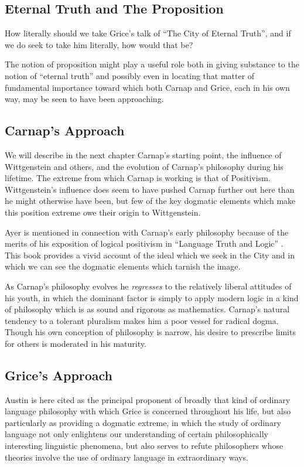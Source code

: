 \documentclass[10pt,titlepage]{book}
\begin{document}
\subsection{Eternal Truth and The Proposition}

How literally should we take Grice's talk of ``The City of Eternal Truth'', and if we do seek to take him literally, how would that be?

The notion of proposition might play a useful role both in giving substance to the notion of ``eternal truth'' and possibly even in locating that matter of fundamental importance toward which both Carnap and Grice, each in his own way, may be seen to have been approaching.

\subsection{Carnap's Approach}

We will describe in the next chapter Carnap's starting point, the influence of Wittgenstein and others, and the evolution of Carnap's philosophy during his lifetime.
The extreme from which Carnap is working is that of Positivism.
Wittgenstein's influence does seem to have pushed Carnap further out here than he might otherwise have been, but few of the key dogmatic elements which make this position extreme owe their origin to Wittgenstein.

Ayer is mentioned in connection with Carnap's early philosophy because of the merits of his exposition of logical positivism in ``Language Truth and Logic'' \cite{ayer1936}.
This book provides a vivid account of the ideal which we seek in the City and in which we can see the dogmatic elements which tarnish the image.

As Carnap's philosophy evolves he \emph{regresses} to the relatively liberal attitudes of his youth, in which the dominant factor is simply to apply modern logic in a kind of philosophy which is as sound and rigorous as mathematics.
Carnap's natural tendency to a tolerant pluralism makes him a poor vessel for radical dogma.
Though his own conception of philosophy is narrow, his desire to prescribe limits for others is moderated in his maturity.

\subsection{Grice's Approach}

Austin is here cited as the principal proponent of broadly that kind of ordinary language philosophy with which Grice is concerned throughout his life, but also particularly as providing a dogmatic extreme, in which the study of ordinary language not only enlightens our understanding of certain philosophically interesting linguistic phenomena, but also serves to refute philosophers whose theories involve the use of ordinary language in extraordinary ways.
\end{document}
